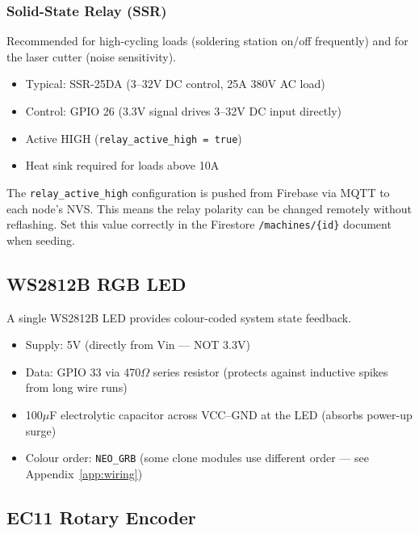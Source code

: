 \subsubsection{Solid-State Relay (SSR)}
Recommended for high-cycling loads (soldering station on/off frequently) and for the laser cutter (noise sensitivity).

\begin{itemize}[leftmargin=1.5em]
    \item Typical: SSR-25DA (3--32V DC control, 25A 380V AC load)
    \item Control: GPIO 26 (3.3V signal drives 3--32V DC input directly)
    \item Active HIGH (\texttt{relay\_active\_high = true})
    \item Heat sink required for loads above 10A
\end{itemize}

\begin{notebox}
The \texttt{relay\_active\_high} configuration is pushed from Firebase via MQTT to each node's NVS. This means the relay polarity can be changed remotely without reflashing. Set this value correctly in the Firestore \texttt{/machines/\{id\}} document when seeding.
\end{notebox}

\subsection{WS2812B RGB LED}

A single WS2812B LED provides colour-coded system state feedback.

\begin{itemize}[leftmargin=1.5em]
    \item Supply: 5V (directly from Vin --- NOT 3.3V)
    \item Data: GPIO 33 via 470$\Omega$ series resistor (protects against inductive spikes from long wire runs)
    \item 100$\mu$F electrolytic capacitor across VCC--GND at the LED (absorbs power-up surge)
    \item Colour order: \texttt{NEO\_GRB} (some clone modules use different order --- see Appendix~\ref{app:wiring})
\end{itemize}

\subsection{EC11 Rotary Encoder}

